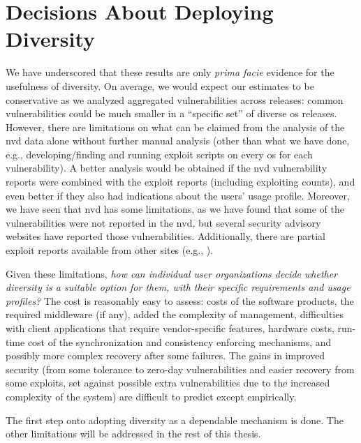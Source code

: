 

\section{Decisions About Deploying Diversity}\label{decisions}
We have underscored that these results are only \textit{prima facie} evidence for the usefulness of diversity. 
On average, we would expect our estimates to be conservative as we analyzed aggregated vulnerabilities across releases: common vulnerabilities could be much smaller in a ``specific set'' of diverse \gls{os} releases. 
However, there are limitations on what can be claimed from the analysis of the \gls{nvd} data alone without further manual analysis (other than what we have done, e.g., developing/finding and running exploit scripts on every \gls{os} for each vulnerability).
A better analysis would be obtained if the \gls{nvd} vulnerability reports were combined with the exploit reports (including exploiting counts), and even better if they also had indications about the users' usage profile.
Moreover, we have seen that \gls{nvd} has some limitations, as we have found that some of the vulnerabilities were not reported in the \gls{nvd}, but several security advisory websites have reported those vulnerabilities.
Additionally, there are partial exploit reports available from other sites (e.g., \cite{cvedetails}).


Given these limitations, \emph{how can individual user organizations decide whether diversity is a suitable option for them, with their specific requirements and usage profiles?}
The cost is reasonably easy to assess: costs of the software products, the required middleware (if any), added the complexity of management, difficulties with client applications that require vendor-specific features, hardware costs, run-time cost of the synchronization and consistency enforcing mechanisms, and possibly more complex recovery after some failures.
The gains in improved security (from some tolerance to zero-day vulnerabilities and easier recovery from some exploits, set against possible extra vulnerabilities due to the increased complexity of the system) are difficult to predict except empirically. 


The first step onto adopting diversity as a dependable mechanism is done. 
The other limitations will be addressed in the rest of this thesis. 


